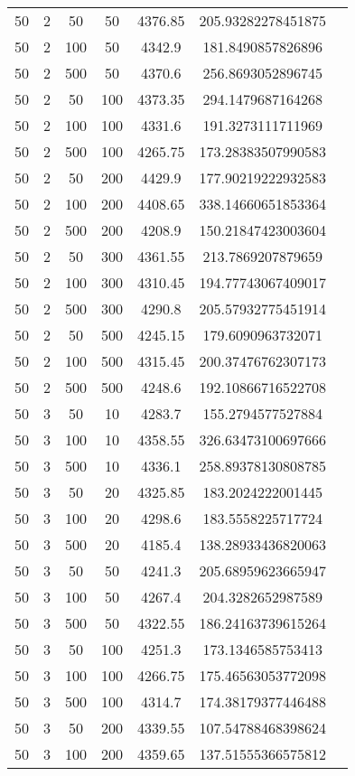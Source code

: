 {\begin{longtabu}{S
S
S
S
S
S[round-mode=places,round-precision=0]
S[round-mode=places,round-precision=0]}
50 & 2 & 50 & 50 & 4376.85 & 205.93282278451875 \\
50 & 2 & 100 & 50 & 4342.9 & 181.8490857826896 \\
50 & 2 & 500 & 50 & 4370.6 & 256.8693052896745 \\
50 & 2 & 50 & 100 & 4373.35 & 294.1479687164268 \\
50 & 2 & 100 & 100 & 4331.6 & 191.3273111711969 \\
50 & 2 & 500 & 100 & 4265.75 & 173.28383507990583 \\
50 & 2 & 50 & 200 & 4429.9 & 177.90219222932583 \\
50 & 2 & 100 & 200 & 4408.65 & 338.14660651853364 \\
50 & 2 & 500 & 200 & 4208.9 & 150.21847423003604 \\
50 & 2 & 50 & 300 & 4361.55 & 213.7869207879659 \\
50 & 2 & 100 & 300 & 4310.45 & 194.77743067409017 \\
50 & 2 & 500 & 300 & 4290.8 & 205.57932775451914 \\
50 & 2 & 50 & 500 & 4245.15 & 179.6090963732071 \\
50 & 2 & 100 & 500 & 4315.45 & 200.37476762307173 \\
50 & 2 & 500 & 500 & 4248.6 & 192.10866716522708 \\
50 & 3 & 50 & 10 & 4283.7 & 155.2794577527884 \\
50 & 3 & 100 & 10 & 4358.55 & 326.63473100697666 \\
50 & 3 & 500 & 10 & 4336.1 & 258.89378130808785 \\
50 & 3 & 50 & 20 & 4325.85 & 183.2024222001445 \\
50 & 3 & 100 & 20 & 4298.6 & 183.5558225717724 \\
50 & 3 & 500 & 20 & 4185.4 & 138.28933436820063 \\
50 & 3 & 50 & 50 & 4241.3 & 205.68959623665947 \\
50 & 3 & 100 & 50 & 4267.4 & 204.3282652987589 \\
50 & 3 & 500 & 50 & 4322.55 & 186.24163739615264 \\
50 & 3 & 50 & 100 & 4251.3 & 173.1346585753413 \\
50 & 3 & 100 & 100 & 4266.75 & 175.46563053772098 \\
50 & 3 & 500 & 100 & 4314.7 & 174.38179377446488 \\
50 & 3 & 50 & 200 & 4339.55 & 107.54788468398624 \\
50 & 3 & 100 & 200 & 4359.65 & 137.51555366575812 \\

\end{longtabu}}
